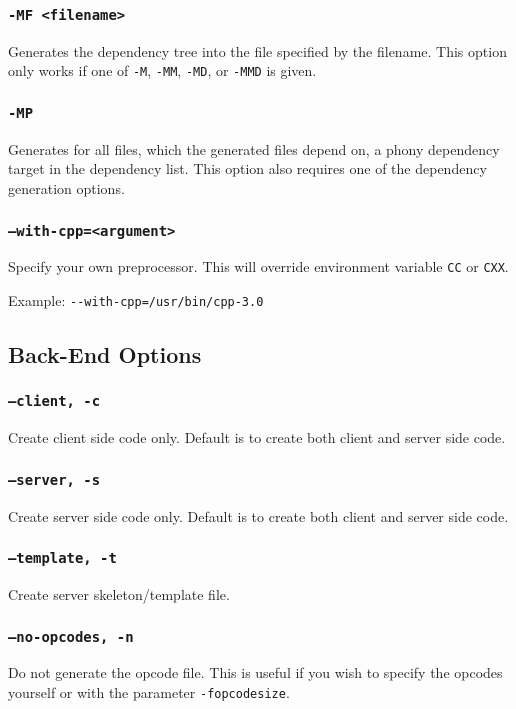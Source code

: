 \subsubsection{{\tt -MF <filename>}}
Generates the dependency tree into the file specified by the filename. This
option only works if one of {\tt -M}, {\tt -MM}, {\tt -MD}, or {\tt -MMD} is
given.

\subsubsection{{\tt -MP}}
Generates for all files, which the generated files depend on, a phony
dependency target in the dependency list. This option also requires one of the
dependency generation options.

\subsubsection{{\tt --with-cpp=<argument>}}
Specify your own preprocessor. This will override environment
variable \verb|CC| or \verb|CXX|.

Example: \verb|--with-cpp=/usr/bin/cpp-3.0|

\subsection{Back-End Options}

\subsubsection{{\tt --client, -c}}
Create client side code only. Default is to create both client and server side code.

\subsubsection{{\tt --server, -s}}
Create server side code only. Default is to create both client and server side code.

\subsubsection{{\tt --template, -t}}
Create server skeleton/template file.

\subsubsection{{\tt --no-opcodes, -n}}
Do not generate the opcode file. This is useful if you wish to specify the opcodes
yourself or with the parameter {\tt -fopcodesize}.

